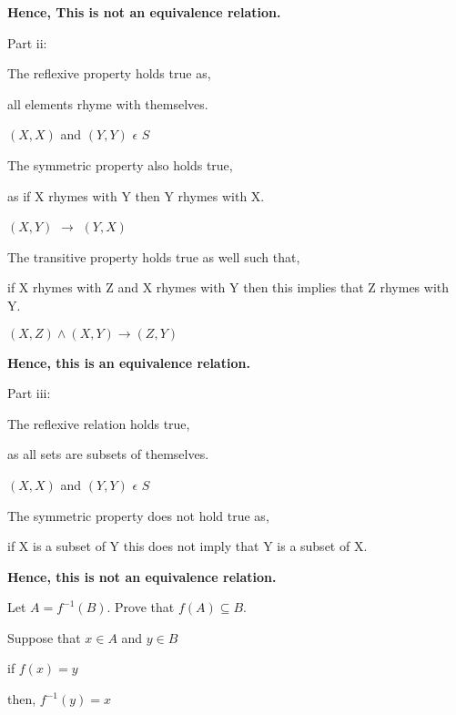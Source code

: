 \documentclass[addpoints]{exam}
\begin{document}
\begin{questions}
\begin{parts}
\begin{solution}
    
    \textbf{Hence, This is not an equivalence relation.}
    
    Part ii:
    
    The reflexive property holds true as,
    
    all elements rhyme with themselves.
    
    $(X,X)$ and $(Y,Y)$ $\epsilon$ $S$
    
    
    The symmetric property also holds true,
    
    as if X rhymes with Y then Y rhymes with X.
    
    $(X,Y)$ $\rightarrow$ $(Y,X)$
    
    
    The transitive property holds true as well such that,
    
    if X rhymes with Z and X rhymes with Y then this implies that Z rhymes with Y.
    
    
        $(X,Z) \wedge (X,Y) \rightarrow (Z,Y)$
        
    \textbf{Hence, this is an equivalence relation.}
    
    
    Part iii:
    
    The reflexive relation holds true,
    
    as all sets are subsets of themselves.
    
    $(X,X)$ and $(Y,Y)$ $\epsilon$ $S$
    
    The symmetric property does not hold true as,
    
    if X is a subset of Y this does not imply that Y is a subset of X.
    
    \textbf{Hence, this is not an equivalence relation.}
    
    
    
    
    
    
    
    
    
    
  \end{solution}

\end{parts}

\question[15] Let $A = f^{-1}(B)$. Prove that $f(A) \subseteq B$.
  \begin{solution}
    
    Suppose that $x \in A$
    and $y \in B$
    
    if $ f(x) = y $
    
    then, $ f^{-1}(y) = x$
    

\end{solution}
\end{questions}
\end{document}
